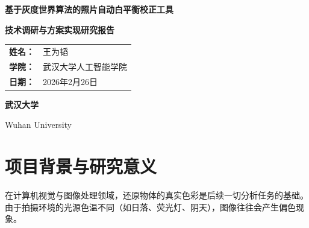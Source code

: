 \documentclass[12pt,a4paper,UTF8]{ctexart} %
\begin{document}
\begin{titlepage}
    \centering
    \vspace*{3cm}
    
    {\Huge \bfseries 基于灰度世界算法的照片自动白平衡校正工具 \par}
    \vspace{1.5cm}
    {\Large \textbf{技术调研与方案实现研究报告} \par}
    
    \vspace{4.5cm}
    
    \begin{minipage}{0.6\textwidth}
        \centering
        \large
        \renewcommand{\arraystretch}{1.6} 
        \begin{tabular}{r l}
            \textbf{姓名：} & 王为韬 \\
            \textbf{学院：} & 武汉大学人工智能学院 \\
            \textbf{日期：} & 2026年2月26日 \\
        \end{tabular}
    \end{minipage}

    \vfill

    {\Large \textbf{武汉大学} \par}
    {\large Wuhan University \par}
    \vspace{1cm}
    
\end{titlepage}

\newpage
\tableofcontents
\newpage


\section{项目背景与研究意义}

在计算机视觉与图像处理领域，还原物体的真实色彩是后续一切分析任务的基础。由于拍摄环境的光源色温不同（如日落、荧光灯、阴天），图像往往会产生偏色现象。
\end{document}
